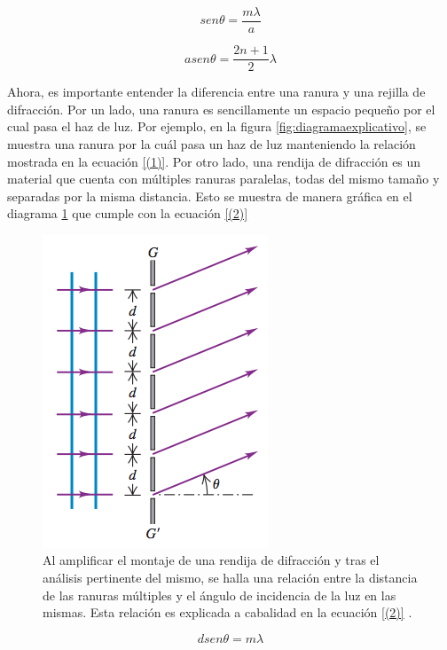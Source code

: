 \documentclass[%
 reprint,
 amsmath,amssymb,
 aps,
]{revtex4-1}
\begin{document}
\begin{equation} \label{(1)}
    sen \theta = \frac{m\lambda}{a}
\end{equation}

\begin{equation} \label{maximos}
    a sen \theta = \frac{2n+1}{2} \lambda
\end{equation}

Ahora, es importante entender la diferencia entre una ranura y una rejilla de difracción. Por un lado, una ranura es sencillamente un espacio pequeño por el cual pasa el haz de luz. Por ejemplo, en la figura \ref{fig:diagramaexplicativo}, se muestra una ranura por la cuál pasa un haz de luz manteniendo la relación mostrada en la ecuación \eqref{(1)}. Por otro lado, una rendija de difracción es un material que cuenta con múltiples ranuras paralelas, todas del mismo tamaño y separadas por la misma distancia. Esto se muestra de manera gráfica en el diagrama \ref{fig:diagramarendija} que cumple con la ecuación \eqref{(2)}

\begin{figure}[H]
    \centering
    \includegraphics[scale= 0.5]{diagramarendija.png}
    \caption{Al amplificar el montaje de una rendija de difracción y tras el análisis pertinente del mismo, se halla una relación entre la distancia de las ranuras múltiples y el ángulo de incidencia de la luz en las mismas. Esta relación es explicada a cabalidad en la ecuación \ref{(2)} \cite{fisicauniversitaria}.}
    \label{fig:diagramarendija}
\end{figure}

\begin{equation} \label{(2)}
    d sen \theta = m\lambda
\end{equation}
\end{document}
